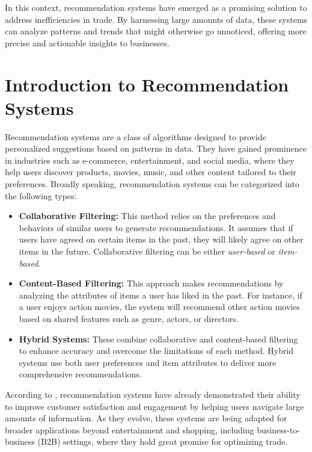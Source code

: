 \documentclass[10pt,twoside,slovak,a4paper]{article}
\begin{document}
In this context, recommendation systems have emerged as a promising solution to address inefficiencies in trade. By harnessing large amounts of data, these systems can analyze patterns and trends that might otherwise go unnoticed, offering more precise and actionable insights to businesses.



\section{Introduction to Recommendation Systems}

Recommendation systems are a class of algorithms designed to provide personalized suggestions based on patterns in data. They have gained prominence in industries such as e-commerce, entertainment, and social media, where they help users discover products, movies, music, and other content tailored to their preferences. Broadly speaking, recommendation systems can be categorized into the following types:

\begin{itemize}
    \item \textbf{Collaborative Filtering:} This method relies on the preferences and behaviors of similar users to generate recommendations. It assumes that if users have agreed on certain items in the past, they will likely agree on other items in the future. Collaborative filtering can be either \textit{user-based} or \textit{item-based}.
    
    \item \textbf{Content-Based Filtering:} This approach makes recommendations by analyzing the attributes of items a user has liked in the past. For instance, if a user enjoys action movies, the system will recommend other action movies based on shared features such as genre, actors, or directors.
    
    \item \textbf{Hybrid Systems:} These combine collaborative and content-based filtering to enhance accuracy and overcome the limitations of each method. Hybrid systems use both user preferences and item attributes to deliver more comprehensive recommendations.
\end{itemize}

\noindent According to \cite{author2023}, recommendation systems have already demonstrated their ability to improve customer satisfaction and engagement by helping users navigate large amounts of information. As they evolve, these systems are being adapted for broader applications beyond entertainment and shopping, including business-to-business (B2B) settings, where they hold great promise for optimizing trade.
\end{document}
